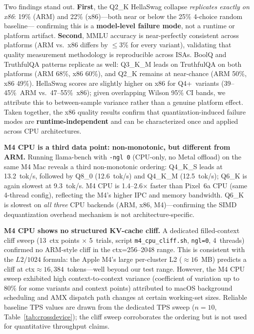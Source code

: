 \documentclass[conference]{IEEEtran}
\begin{document}
Two findings stand out.
\textbf{First}, the Q2\_K HellaSwag collapse \emph{replicates exactly on x86}:
19\% (ARM) and 22\% (x86)---both near or below the 25\% 4-choice random baseline---
confirming this is a \textbf{model-level failure mode}, not a runtime or platform artifact.
\textbf{Second}, MMLU accuracy is near-perfectly consistent across platforms
(ARM vs.\ x86 differs by $\leq$3\% for every variant), validating that quality
measurement methodology is reproducible across ISAs.
BoolQ and TruthfulQA patterns replicate as well: Q3\_K\_M leads on TruthfulQA on both
platforms (ARM 68\%, x86 60\%), and Q2\_K remains at near-chance (ARM 50\%, x86 49\%).
HellaSwag scores are slightly higher on x86 for Q4+~variants (39--45\%~ARM vs.\
47--55\%~x86); given overlapping Wilson 95\% CI bands, we attribute this to
between-sample variance rather than a genuine platform effect.
Taken together, the x86 quality results confirm that quantization-induced failure
modes are \textbf{runtime-independent} and can be characterized once and applied
across CPU architectures.

\textbf{M4 CPU is a third data point: non-monotonic, but different from ARM.}
Running llama-bench with \texttt{-ngl~0} (CPU-only, no Metal offload) on the same M4 Mac
reveals a third non-monotonic ordering: Q4\_K\_S leads at 13.2~tok/s, followed by
Q8\_0 (12.6~tok/s) and Q4\_K\_M (12.5~tok/s); Q6\_K is again slowest at 9.3~tok/s.
M4 CPU is 1.4--2.6$\times$ faster than Pixel~6a CPU (same 4-thread config), reflecting
the M4's higher IPC and memory bandwidth.
Q6\_K is slowest on \emph{all three} CPU backends (ARM, x86, M4)---confirming the
SIMD dequantization overhead mechanism is not architecture-specific.

\textbf{M4 CPU shows no structured KV-cache cliff.}
A dedicated filled-context cliff sweep (13~ctx points $\times$ 5~trials, script
\texttt{m4\_cpu\_cliff.sh}, \texttt{ngl=0}, 4~threads) confirmed no ARM-style cliff
in the ctx=256--2048 range.
This is consistent with the $L2/1024$ formula: the Apple M4's large per-cluster
L2 (${\approx}16$~MB) predicts a cliff at ctx${}\approx{}16{,}384$~tokens---well
beyond our test range.
However, the M4 CPU sweep exhibited high context-to-context variance
(coefficient of variation up to 80\% for some variants and context points) attributed
to macOS background scheduling and AMX dispatch path changes at certain working-set
sizes.
Reliable baseline TPS values are drawn from the dedicated TPS sweep ($n{=}10$,
Table~\ref{tab:crossdevice}); the cliff sweep corroborates the ordering but is
not used for quantitative throughput claims.
\end{document}
